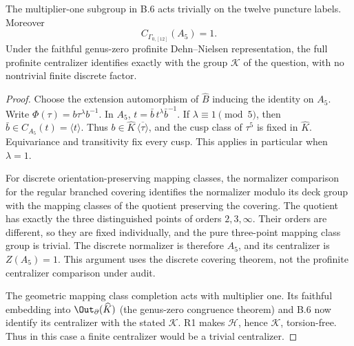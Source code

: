 The multiplier-one subgroup in B.6 acts trivially on the twelve
puncture labels. Moreover
\[
 C_{\Gamma_{0,[12]}}(A_5)=1.
\]
Under the faithful genus-zero profinite Dehn--Nielsen representation,
the full profinite centralizer identifies exactly with the group
\(\mathcal K\) of the question, with no nontrivial finite discrete factor.
\begin{proof}
Choose the extension automorphism of \(\widehat B\) inducing the
identity on \(A_5\). Write
\(\Phi(\tau)=b\tau^\lambda b^{-1}\). In \(A_5\),
\(t=\bar b\,t^\lambda\bar b^{-1}\). If
\(\lambda\equiv1\pmod5\), then
\(\bar b\in C_{A_5}(t)=\langle t\rangle\). Thus
\(b\in\widehat K\,\overline{\langle\tau\rangle}\), and the cusp
class of \(\tau^5\) is fixed in \(\widehat K\).
Equivariance and transitivity fix every cusp. This applies in
particular when \(\lambda=1\).

For discrete orientation-preserving mapping classes, the normalizer
comparison for the regular branched covering identifies the
normalizer modulo its deck group with the mapping classes of the
quotient preserving the covering. The quotient has exactly the
three distinguished points of orders \(2,3,\infty\). Their orders
are different, so they are fixed individually, and the pure
three-point mapping class group is trivial. The discrete normalizer
is therefore \(A_5\), and its centralizer is \(Z(A_5)=1\).
This argument uses the discrete covering theorem, not the
profinite centralizer comparison under audit.

The geometric mapping class completion acts with multiplier one.
Its faithful embedding into \(\Out_{\partial}(\widehat K)\)
(the genus-zero congruence theorem) and B.6 now identify its
centralizer with the stated \(\mathcal K\).
R1 makes \(\mathcal H\), hence \(\mathcal K\), torsion-free.
Thus in this case a finite centralizer would be a trivial centralizer.
\end{proof}
